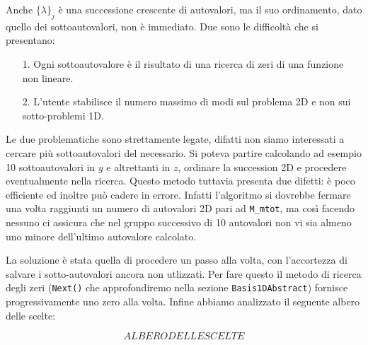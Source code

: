 Anche $\{\lambda\}_j$ \`e una successione crescente di autovalori, ma il suo ordinamento, dato quello dei sottoautovalori, non \`e immediato. Due sono le difficolt\`a che si presentano:
\begin{itemize}
\item[1.] Ogni sottoautovalore \`e il risultato di una ricerca di zeri di una funzione non lineare.
\item[2.] L'utente stabilisce il numero massimo di modi sul problema 2D e non sui sotto-problemi 1D.
\end{itemize}

Le due problematiche sono strettamente legate, difatti non siamo interessati a cercare pi\`u sottoautovalori del necessario. Si poteva partire calcolando ad esempio 10 sottoautovalori in $y$ e altrettanti in $z$, ordinare la succession 2D e procedere eventualmente nella ricerca. Questo metodo tuttavia presenta due difetti: \`e poco efficiente ed inoltre pu\`o cadere in errore. Infatti l'algoritmo si dovrebbe fermare una volta raggiunti un numero di autovalori 2D pari ad \texttt{M\_mtot}, ma cos\`i facendo nessuno ci assicura che nel gruppo successivo di 10 autovalori non vi sia almeno uno minore dell'ultimo autovalore calcolato.

La soluzione \`e stata quella di procedere un passo alla volta, con l'accortezza di salvare i sotto-autovalori ancora non utlizzati. Per fare questo il metodo di ricerca degli zeri (\texttt{Next()} che approfondiremo nella sezione \texttt{Basis1DAbstract}) fornisce progressivamente uno zero alla volta. Infine abbiamo analizzato il seguente albero delle scelte:

\begin{equation}
ALBERO DELLE SCELTE
\end{equation}

\begin{center}
\end{center}


